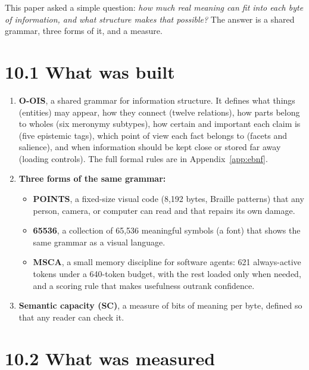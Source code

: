 \label{sec:conclusion}

This paper asked a simple question: \textit{how much real meaning can fit into each byte of information, and what structure makes that possible?} The answer is a shared grammar, three forms of it, and a measure.

\section*{10.1 What was built}

\begin{enumerate}
\item \textbf{O-OIS}, a shared grammar for information structure. It defines what things (entities) may appear, how they connect (twelve relations), how parts belong to wholes (six meronymy subtypes), how certain and important each claim is (five epistemic tags), which point of view each fact belongs to (facets and salience), and when information should be kept close or stored far away (loading controls). The full formal rules are in Appendix~\ref{app:ebnf}.
\item \textbf{Three forms of the same grammar:}
\begin{itemize}
\item \textbf{POINTS}, a fixed-size visual code (8,192 bytes, Braille patterns) that any person, camera, or computer can read and that repairs its own damage.
\item \textbf{65536}, a collection of 65,536 meaningful symbols (a font) that shows the same grammar as a visual language.
\item \textbf{MSCA}, a small memory discipline for software agents: 621 always-active tokens under a 640-token budget, with the rest loaded only when needed, and a scoring rule that makes usefulness outrank confidence.
\end{itemize}
\item \textbf{Semantic capacity (SC)}, a measure of bits of meaning per byte, defined so that any reader can check it.
\end{enumerate}

\section*{10.2 What was measured}

